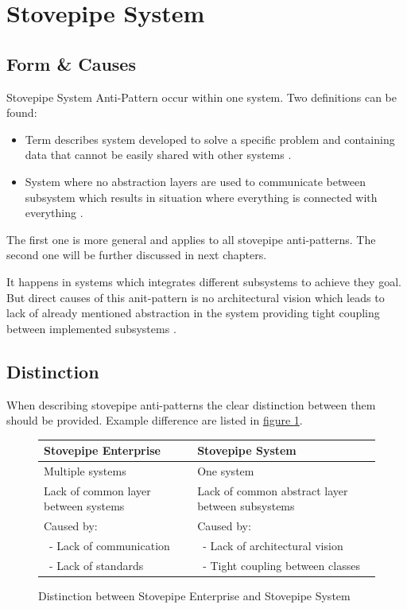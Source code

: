 \section{Stovepipe System}

\subsection{Form \& Causes}
Stovepipe System Anti-Pattern occur within one system. Two definitions can be found:
\begin{itemize}
\item Term describes system developed to solve a specific problem and containing data that cannot be easily shared with other systems \cite{c2com}.
\item System where no abstraction layers are used to communicate between subsystem which results in situation where everything is connected with everything \cite{Virtual,Solutions}.
\end{itemize}
The first one is more general and applies to all stovepipe anti-patterns.
The second one will be further discussed in next chapters.

It happens in systems which integrates different subsystems to achieve they goal. But direct causes of this anit-pattern is no architectural vision which leads to lack of already mentioned abstraction in the system providing tight coupling between implemented subsystems \cite{SurvivalGuide}.


\subsection{Distinction}

When describing stovepipe anti-patterns the clear distinction between them should be provided. Example difference are listed in \hyperref[tab:Distinction]{figure \ref{tab:Distinction}}.

\def\arraystretch{1.6}
\begin{center}
\begin{figure}[!h]
	\begin{tabular}{|p{.48\linewidth}|p{.48\linewidth}|}
	    \hline
	    Stovepipe Enterprise & Stovepipe System \\
	    \hline
	    Multiple systems & One system \\
	    Lack of common layer between systems & Lack of common abstract layer between subsystems \\
	    Caused by: & Caused by: \\
	    \ - Lack of communication & \ - Lack of architectural vision \\
	    \ - Lack of standards & \  - Tight coupling between classes \\
	    \hline
	\end{tabular}
\caption{Distinction between Stovepipe Enterprise and Stovepipe System}
\label{tab:Distinction}
\end{figure}
\end{center}

